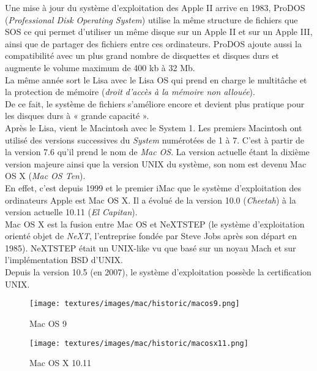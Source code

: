 \newpage

Une mise à jour du système d'exploitation des Apple II arrive en 1983, ProDOS
(\textit{Professional Disk Operating System}) utilise la même structure de
fichiers que SOS ce qui permet d’utiliser un même disque sur un Apple II et sur
un Apple III, ainsi que de partager des fichiers entre ces ordinateurs. ProDOS
ajoute aussi la compatibilité avec un plus grand nombre de disquettes et
disques durs et augmente le volume maximum de 400 kb à 32 Mb. \\

La même année sort le Lisa avec le Lisa OS qui prend en charge le multitâche et
la protection de mémoire (\textit{droit d’accès à la mémoire non allouée}). \\
De ce fait, le système de fichiers s’améliore encore et devient plus pratique
pour les disques durs à « grande capacité ». \\

Après le Lisa, vient le Macintosh avec le System 1. Les premiers Macintosh ont
utilisé des versions successives du \textit{System} numérotées de 1 à 7. C’est
à partir de la version 7.6 qu’il prend le nom de \textit{Mac OS}. La version
actuelle étant la dixième version majeure ainsi que la version UNIX du système,
son nom est devenu Mac OS X (\textit{Mac OS Ten}). \\

En effet, c'est depuis 1999 et le premier iMac que le système d'exploitation
des ordinateurs Apple est Mac OS X. Il a évolué de la version 10.0
(\textit{Cheetah}) à la version actuelle 10.11 (\textit{El Capitan}). \\

Mac OS X est la fusion entre Mac OS et NeXTSTEP (le système d’exploitation
orienté objet de \textit{NeXT}, l’entreprise fondée par Steve Jobs après son
départ en 1985). NeXTSTEP était un UNIX-like vu que basé sur un noyau Mach et
sur l’implémentation BSD d’UNIX.  \\

Depuis la version 10.5 (en 2007), le système d’exploitation possède la
certification UNIX.

\begin{figure}[!htb]
  \texttt{[image: textures/images/mac/historic/macos9.png]}
  \caption{Mac OS 9}\label{fig:OS 9}
	\endminipage\hfill
  \texttt{[image: textures/images/mac/historic/macosx11.png]}
  \caption{Mac OS X 10.11}\label{fig:OS X}
	\endminipage
\end{figure}

